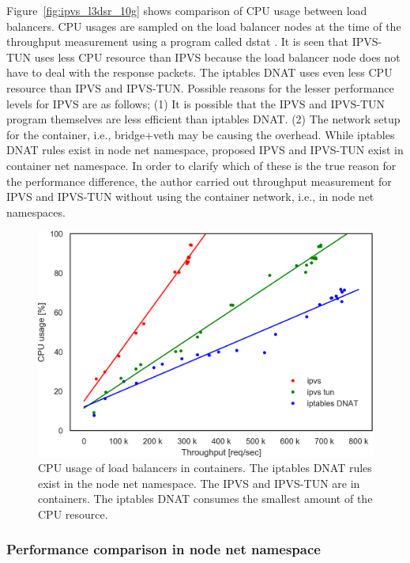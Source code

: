 Figure~\ref{fig:ipvs_l3dsr_10g} shows comparison of CPU usage between load balancers.
CPU usages are sampled on the load balancer nodes at the time of the throughput measurement using a program called dstat \cite{wieers2019dstat}.
It is seen that IPVS-TUN uses less CPU resource than IPVS because the load balancer node does not have to deal with the response packets.
The iptables DNAT uses even less CPU resource than IPVS and IPVS-TUN.
Possible reasons for the lesser performance levels for IPVS are as follows;
(1) It is possible that the IPVS and IPVS-TUN program themselves are less efficient than iptables DNAT.
(2) The network setup for the container, i.e., bridge+veth may be causing the overhead.
While iptables DNAT rules exist in node net namespace, proposed IPVS and IPVS-TUN exist in container net namespace.
In order to clarify which of these is the true reason for the performance difference, the author carried out throughput measurement for IPVS and IPVS-TUN without using the container network, i.e., in node net namespaces.

\begin{figure}[h]
  \centering
  \includegraphics[width=0.8\columnwidth]{Figs/cpu_usage_10g}
  \par\bigskip
  \centering
  \begin{minipage}{0.9\columnwidth}
    \caption[CPU usage of load balancers in containers]{
      CPU usage of load balancers in containers.
      The iptables DNAT rules exist in the node net namespace.
      The IPVS and IPVS-TUN are in containers.
      The iptables DNAT consumes the smallest amount of the CPU resource.
    }
    \label{fig:cpu_usage_10g}
  \end{minipage}
\end{figure}

\FloatBarrier

\subsubsection{Performance comparison in node net namespace}

